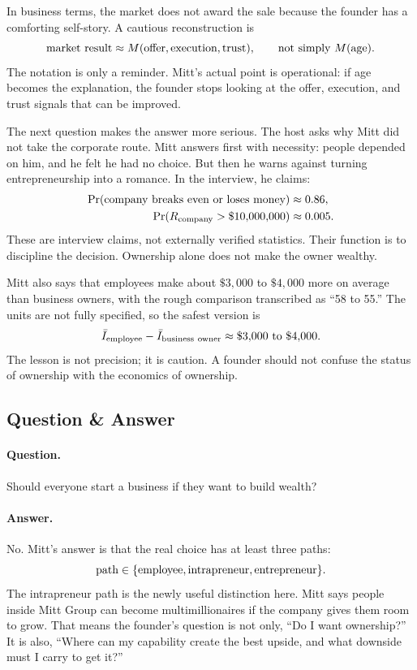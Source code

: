 \documentclass[11pt,oneside]{book}
\begin{document}
In business terms, the market does not award the sale because the founder has a comforting self-story. A cautious reconstruction is
\[
\hbox{market result}
\approx
M(\hbox{offer},\hbox{execution},\hbox{trust}),
\qquad
\hbox{not simply }M(\hbox{age}).
\]
The notation is only a reminder. Mitt's actual point is operational: if age becomes the explanation, the founder stops looking at the offer, execution, and trust signals that can be improved.

The next question makes the answer more serious. The host asks why Mitt did not take the corporate route. Mitt answers first with necessity: people depended on him, and he felt he had no choice. But then he warns against turning entrepreneurship into a romance. In the interview, he claims:
\begin{align}
\Pr(\hbox{company breaks even or loses money}) &\approx 0.86,\\
\Pr(R_{\mathrm{company}}>\$10{,}000{,}000) &\approx 0.005.
\end{align}
These are interview claims, not externally verified statistics. Their function is to discipline the decision. Ownership alone does not make the owner wealthy.

Mitt also says that employees make about \(\$3{,}000\) to \(\$4{,}000\) more on average than business owners, with the rough comparison transcribed as ``58 to 55.'' The units are not fully specified, so the safest version is
\[
\bar I_{\mathrm{employee}}
-
\bar I_{\mathrm{business\ owner}}
\approx
\$3{,}000\hbox{ to }\$4{,}000.
\]
The lesson is not precision; it is caution. A founder should not confuse the status of ownership with the economics of ownership.

\subsection{Question \& Answer}

\paragraph{Question.}
Should everyone start a business if they want to build wealth?

\paragraph{Answer.}
No. Mitt's answer is that the real choice has at least three paths:
\[
\hbox{path}
\in
\{\hbox{employee},\hbox{intrapreneur},\hbox{entrepreneur}\}.
\]
The intrapreneur path is the newly useful distinction here. Mitt says people inside Mitt Group can become multimillionaires if the company gives them room to grow. That means the founder's question is not only, ``Do I want ownership?'' It is also, ``Where can my capability create the best upside, and what downside must I carry to get it?''
\end{document}
